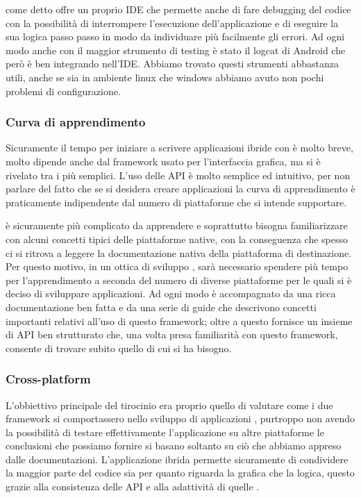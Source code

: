         \tisdk{} come detto offre un proprio IDE che permette anche di fare
        debugging del codice \js{} con la possibilità di interrompere
        l'esecuzione dell'applicazione e di eseguire la sua logica passo passo
        in modo da individuare più facilmente gli errori. Ad ogni modo anche
        con \tisdk{} il maggior strumento di testing è stato il logcat di
        Android che però è ben integrando nell'IDE. Abbiamo trovato
        questi strumenti abbastanza utili, anche se sia in ambiente linux che
        windows abbiamo avuto non pochi problemi di configurazione.
        \subsubsection{Curva di apprendimento}
        Sicuramente il tempo per iniziare a scrivere applicazioni ibride con
        \pg{} è molto breve, molto dipende anche dal framework usato per
        l'interfaccia grafica, ma \kendomob{} si è rivelato tra i più semplici.
        L'uso delle API è molto semplice ed intuitivo, per non parlare del
        fatto che se si desidera creare applicazioni \crossplat{} la curva di
        apprendimento è praticamente indipendente dal numero di piattaforme
        che si intende supportare.

        \tisdk{} è sicuramente più complicato da apprendere e soprattutto
        bisogna familiarizzare con alcuni concetti tipici delle piattaforme
        native, con la conseguenza che spesso ci si ritrova a leggere la
        documentazione nativa della piattaforma di destinazione. Per
        questo motivo, in un ottica di sviluppo \crossplat{}, sarà necessario
        spendere più tempo per l'apprendimento a seconda del numero di diverse
        piattaforme per le quali si è deciso di sviluppare applicazioni. Ad
        ogni modo \tisdk{} è accompagnato da una ricca documentazione ben
        fatta e da una serie di guide che descrivono concetti
        importanti relativi all'uso di questo framework; oltre a questo
        \tisdk{} fornisce un insieme di API ben strutturato che, una volta
        presa familiarità con questo framework, consente di trovare subito
        quello di cui si ha bisogno.
        \subsubsection{Cross-platform}
        L'obbiettivo principale del tirocinio era proprio quello di valutare
        come i due framework si comportassero nello sviluppo di applicazioni
        \crossplat{}, purtroppo non avendo la possibilità di testare
        effettivamente l'applicazione su altre piattaforme le conclusioni che
        possiamo fornire si basano soltanto su ciò che abbiamo appreso dalle
        documentazioni. L'applicazione ibrida permette sicuramente di
        condividere la maggior parte del codice sia per quanto riguarda la
        grafica che la logica, questo grazie alla consistenza delle API \pg{}
        e alla adattività di quelle \kendomob{}.


